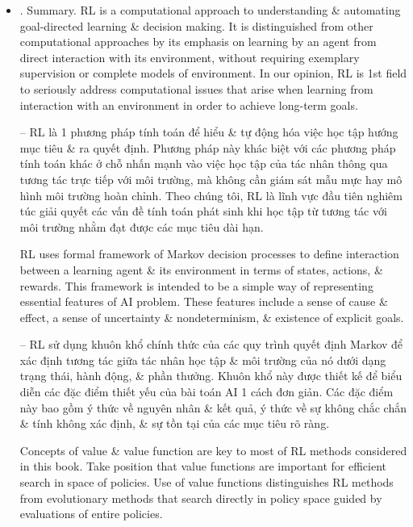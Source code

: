\documentclass{article}
\newtheorem{problem}{Problem}
\begin{document}
\begin{itemize}
\begin{itemize}
\begin{problem}[Other Improvements]
            -- Bạn có thể nghĩ ra cách nào khác để cải thiện trình chơi RL không? Bạn có thể nghĩ ra cách nào tốt hơn để giải bài toán tic-tac-toe như đã nêu không?
        \end{problem}
        \item {. Summary.} RL is a computational approach to understanding \& automating goal-directed learning \& decision making. It is distinguished from other computational approaches by its emphasis on learning by an agent from direct interaction with its environment, without requiring exemplary supervision or complete models of environment. In our opinion, RL is 1st field to seriously address computational issues that arise when learning from interaction with an environment in order to achieve long-term goals.

        -- RL là 1 phương pháp tính toán để hiểu \& tự động hóa việc học tập hướng mục tiêu \& ra quyết định. Phương pháp này khác biệt với các phương pháp tính toán khác ở chỗ nhấn mạnh vào việc học tập của tác nhân thông qua tương tác trực tiếp với môi trường, mà không cần giám sát mẫu mực hay mô hình môi trường hoàn chỉnh. Theo chúng tôi, RL là lĩnh vực đầu tiên nghiêm túc giải quyết các vấn đề tính toán phát sinh khi học tập từ tương tác với môi trường nhằm đạt được các mục tiêu dài hạn.

        RL uses formal framework of Markov decision processes to define interaction between a learning agent \& its environment in terms of states, actions, \& rewards. This framework is intended to be a simple way of representing essential features of AI problem. These features include a sense of cause \& effect, a sense of uncertainty \& nondeterminism, \& existence of explicit goals.

        -- RL sử dụng khuôn khổ chính thức của các quy trình quyết định Markov để xác định tương tác giữa tác nhân học tập \& môi trường của nó dưới dạng trạng thái, hành động, \& phần thưởng. Khuôn khổ này được thiết kế để biểu diễn các đặc điểm thiết yếu của bài toán AI 1 cách đơn giản. Các đặc điểm này bao gồm ý thức về nguyên nhân \& kết quả, ý thức về sự không chắc chắn \& tính không xác định, \& sự tồn tại của các mục tiêu rõ ràng.

        Concepts of value \& value function are key to most of RL methods considered in this book. Take position that value functions are important for efficient search in space of policies. Use of value functions distinguishes RL methods from evolutionary methods that search directly in policy space guided by evaluations of entire policies.


\end{itemize}
\end{itemize}
\end{document}

